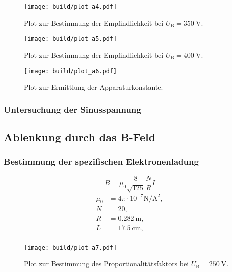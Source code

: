 \begin{figure}
  \centering
  \texttt{[image: build/plot\_a4.pdf]}
  \caption{Plot zur Bestimmung der Empfindlichkeit bei $U_{\text{B}} = \SI{350}{\volt}$.}
  \label{plot:4}
\end{figure}

\begin{figure}
  \centering
  \texttt{[image: build/plot\_a5.pdf]}
  \caption{Plot zur Bestimmung der Empfindlichkeit bei $U_{\text{B}} = \SI{400}{\volt}$.}
  \label{plot:5}
\end{figure}

\begin{figure}
  \centering
  \texttt{[image: build/plot\_a6.pdf]}
  \caption{Plot zur Ermittlung der Apparaturkonstante.}
  \label{plot:6}
\end{figure}

\clearpage


\subsubsection{Untersuchung der Sinusspannung}


\clearpage
\subsection{Ablenkung durch das B-Feld}
\subsubsection{Bestimmung der spezifischen Elektronenladung}

\begin{equation}
  B = \mu_0 \frac{8}{\sqrt{125}}\frac{N}{R} I
\end{equation}
\begin{align*}
  \mu_0 &= 4\pi \cdot 10^{-7}\si{\newton\per\ampere\tothe{2}},\\
  N    &= 20,\\
  R    &= \SI{0,282}{\metre} ,\\
  L    &= \SI{17,5}{\centi\metre},\\
\end{align*}


\begin{figure}
  \centering
  \texttt{[image: build/plot\_a7.pdf]}
  \caption{Plot zur Bestimmung des Proportionalitätsfaktors bei $U_{\text{B}} = \SI{250}{\volt}$.}
  \label{plot:7}
\end{figure}

